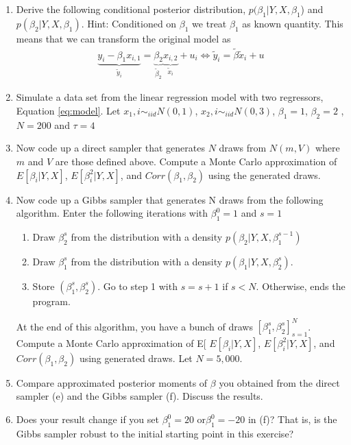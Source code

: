 \documentclass[12pt,onecolumn]{article}
\begin{document}
\begin{enumerate}
\begin{enumerate}
  \item Derive the following conditional posterior distribution, $p(\beta_1|Y,X,\beta_1$) and $p(\beta_2|Y,X,\beta_1)$. Hint: Conditioned on $\beta_1$ we treat $\beta_1$ as known quantity. This means that we can transform the original model as
  \begin{align}
    \underset{\tilde{y}_{i}}{\underbrace{y_{i}-\beta_{1}x_{i,1}}}=\underset{\tilde{\beta}_{2}}{\underbrace{\beta_{2}}}\underset{\tilde{x}_{i}}{\underbrace{x_{i,2}}}+u_{i}\iff\tilde{y}_{i}=\tilde{\beta}\tilde{x}_{i}+u
  \end{align}
  \item Simulate a data set from the linear regression model with two regressors, Equation \eqref{eq:model}. Let $x_1,i\sim_{iid}N(0,1)$, $x_2,i\sim_{iid}N(0,3)$, $\beta_1=1$, $\beta_2=2$ , $N =200$ and $\tau= 4$
  \item Now code up a direct sampler that generates $N$ draws from $N(m,V)$ where $m$ and $V$ are those defined above. Compute a Monte Carlo approximation of $E[\beta_i|Y, X]$, $E[\beta^2_i|Y, X]$, and $Corr(\beta_1, \beta_2)$ using the generated draws.
  \item Now code up a Gibbs sampler that generates N draws from the following algorithm. Enter the following iterations with $\beta^{0}_1=1$ and $s=1$
  \begin{enumerate}
    \item Draw $\beta^s_2$ from the distribution with a density $p(\beta_2|Y, X, \beta^{s-1}_1)$
  \item Draw $\beta^s_1$ from the distribution with a density $p(\beta_1|Y, X, \beta^s_2)$.
  \item Store $(\beta^s_1,\beta^s_2)$. Go to step 1 with $s = s+1$ if $s < N$. Otherwise, ends the program.  
  \end{enumerate}
  At the end of this algorithm, you have a bunch of draws $[\beta^s_1,\beta^s_2]^N_{s=1}$. Compute a Monte Carlo approximation of E[ $E[\beta_i|Y, X]$, $E[\beta^2_i|Y, X]$, and $Corr(\beta_1, \beta_2)$  using generated draws. Let $N = 5,000$.
\item  Compare approximated posterior moments of $\beta$ you obtained from the direct sampler (e) and the Gibbs sampler (f). Discuss the results.
\item  Does your result change if you set $\beta^0_1= 20$ or$\beta^0_1= -20$ in (f)? That is, is the Gibbs sampler robust to the initial starting point in this exercise?
\end{enumerate}


\end{enumerate}
\end{document}
